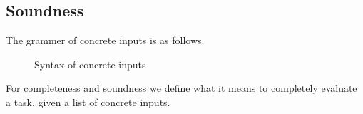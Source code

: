 %
%
%
%
%
%

\subsection{Soundness}

The grammer of concrete inputs is as follows.

\begin{figure}
\caption{Syntax of concrete inputs}
\label{fig:inputsConcrete}
\end{figure}


For completeness and soundness we define what it means to completely evaluate a task, given a list of concrete inputs.


